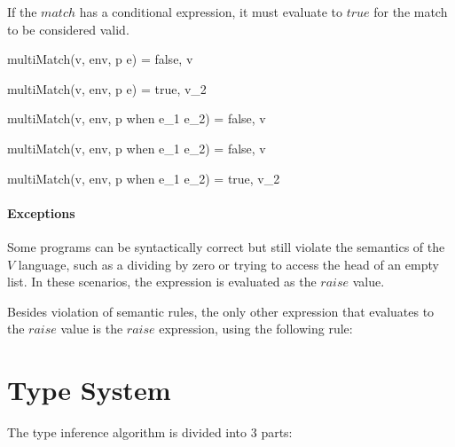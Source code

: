 \documentclass{article}
\begin{document}
If the $match$ has a conditional expression, it must evaluate to $true$ for the match to be considered valid.

  {multiMatch(v, \mbox{env}, p \rightarrow e) = false, v}

  {multiMatch(v, \mbox{env}, p \rightarrow e) = true, v_2}

  {multiMatch(v, \mbox{env}, p \; \mbox{when} \; e_1 \rightarrow e_2) = false, v}

  {multiMatch(v, \mbox{env}, p \; \mbox{when} \; e_1 \rightarrow e_2) = false, v}

  {multiMatch(v, \mbox{env}, p \; \mbox{when} \; e_1 \rightarrow e_2) = true, v_2}

\paragraph{Exceptions}

Some programs can be syntactically correct but still violate the semantics of the $V$ language, such as a dividing by zero or trying to access the head of an empty list.
In these scenarios, the expression is evaluated as the $raise$ value.

Besides violation of semantic rules, the only other expression that evaluates to the $raise$ value is the $raise$ expression, using the following rule:


\section{Type System}

The type inference algorithm is divided into 3 parts:
\end{document}
